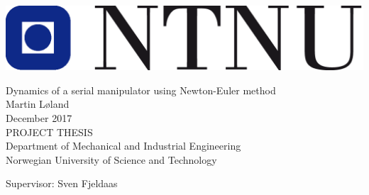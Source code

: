 
\thispagestyle{empty}
\mbox{}\\[2pc]
\includegraphics[scale=0.6]{img/ntnu}
\mbox{}\\[6pc]
\begin{center}
\Huge{Dynamics of a serial manipulator using Newton-Euler method}\\[2pc]

\Large{Martin Løland}\\[1pc]
\large{December 2017}\\[2pc]

PROJECT THESIS\\
Department of Mechanical and Industrial Engineering\\
Norwegian University of Science and Technology
\end{center}
\vfill

\noindent Supervisor: Sven Fjeldaas
